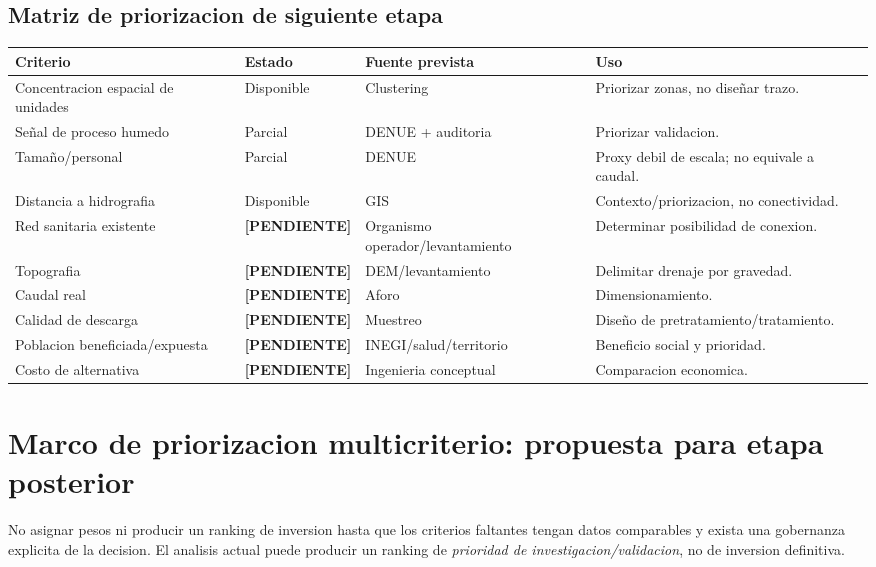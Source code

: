 \documentclass[11pt,letterpaper]{article}
\newcommand{\pendiente}{\textcolor{AtoyacRed}{\textbf{[PENDIENTE]}}}
\begin{document}
\subsection{Matriz de priorizacion de siguiente etapa}
\begin{longtable}{p{}p{}p{}p{}}
\toprule
\textbf{Criterio} & \textbf{Estado} & \textbf{Fuente prevista} & \textbf{Uso} \\
\midrule
Concentracion espacial de unidades & Disponible & Clustering & Priorizar zonas, no diseñar trazo. \\
Señal de proceso humedo & Parcial & DENUE + auditoria & Priorizar validacion. \\
Tamaño/personal & Parcial & DENUE & Proxy debil de escala; no equivale a caudal. \\
Distancia a hidrografia & Disponible & GIS & Contexto/priorizacion, no conectividad. \\
Red sanitaria existente & \pendiente & Organismo operador/levantamiento & Determinar posibilidad de conexion. \\
Topografia & \pendiente & DEM/levantamiento & Delimitar drenaje por gravedad. \\
Caudal real & \pendiente & Aforo & Dimensionamiento. \\
Calidad de descarga & \pendiente & Muestreo & Diseño de pretratamiento/tratamiento. \\
Poblacion beneficiada/expuesta & \pendiente & INEGI/salud/territorio & Beneficio social y prioridad. \\
Costo de alternativa & \pendiente & Ingenieria conceptual & Comparacion economica. \\
\bottomrule
\end{longtable}

\section{Marco de priorizacion multicriterio: propuesta para etapa posterior}

\begin{alerta}
No asignar pesos ni producir un ranking de inversion hasta que los criterios faltantes tengan datos comparables y exista una gobernanza explicita de la decision. El analisis actual puede producir un ranking de \textit{prioridad de investigacion/validacion}, no de inversion definitiva.
\end{alerta}
\end{document}
